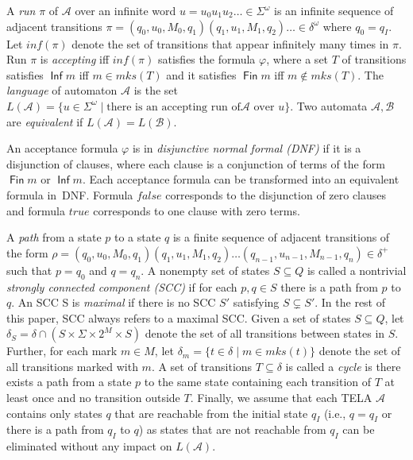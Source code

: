 \documentclass[a4paper,UKenglish,cleveref,autoref,thm-restate]{lipics-v2021}
\newcommand{\todo}[1]{\marginpar{\textcolor{red}{#1}}}
\DeclareMathOperator{\Inf}{\mathsf{Inf}}
\DeclareMathOperator{\Fin}{\mathsf{Fin}}
\newcommand{\minf}{\mathit{inf}}
\newcommand{\mks}{\mathit{mks}}
\def\false{\mathit{false}}
\def\true{\mathit{true}}
\newcommand{\mA}{\mathcal{A}}
\newcommand{\mB}{\mathcal{B}}
\begin{document}
A \emph{run} $\pi$ of $\mA$ over an infinite word
$u = u_{0}u_{1}u_{2}\ldots \in \Sigma^{\omega}$ is an infinite sequence
of adjacent transitions
$\pi=(q_0,u_0,M_0,q_1)(q_1,u_1,M_1,q_2)\ldots\in\delta^{\omega}$ where
$q_0=q_I$. Let $\minf(\pi)$ denote the set of transitions that appear
infinitely many times in $\pi$. Run $\pi$ is \emph{accepting} iff
$\minf(\pi)$ satisfies the formula $\varphi$, where a set $T$ of
transitions satisfies $\Inf m$ iff $m\in\mks(T)$ and it satisfies
$\Fin m$ iff $m\not\in\mks(T)$. The \emph{language} of automaton $\mA$ is
the set
$L(\mA)=\{u\in \Sigma^{\omega}\mid\textrm{there is an accepting run of
}\mA\textrm{ over }u\}$. Two automata $\mA,\mB$ are \emph{equivalent}
if $L(\mA)=L(\mB)$.

An acceptance formula $\varphi$ is in \emph{disjunctive normal formal
  (DNF)} if it is a disjunction of clauses, where each clause is a
conjunction of terms of the form $\Fin m$ or $\Inf m$.  Each
acceptance formula can be transformed into an equivalent formula
in~DNF. Formula $\false$ corresponds to the disjunction of zero
clauses and formula $\true$ corresponds to one clause with zero terms.

A \emph{path} from a state $p$ to a state $q$ is a finite sequence of
adjacent transitions of the form
$\rho=(q_0,u_0,M_0,q_1)(q_1,u_1,M_1,q_2)\ldots(q_{n-1},u_{n-1},M_{n-1},q_n)\in\delta^+$
such that $p=q_0$ and $q=q_n$. A nonempty set of states $S\subseteq Q$
is called a nontrivial \emph{strongly connected component (SCC)} if
for each $p,q\in S$ there is a path from $p$ to $q$. An SCC S is
\emph{maximal} if there is no SCC $S'$ satisfying $S\subsetneq S'$. In
the rest of this paper, SCC always refers to a maximal SCC. Given a
set of states $S\subseteq Q$, let $\delta_S=\delta\cap (S\times \Sigma \times 2^M \times S)$
denote the set of all transitions between states in $S$. Further, for
each mark $m\in M$, let $\delta_m=\{t\in\delta\mid m\in
\mks(t)\}$ denote the set of all transitions
marked with $m$.
A set of transitions $T\subseteq\delta$ is called a \emph{cycle} is
there exists a path from a state $p$ to the same state containing each
transition of $T$ at least once and no transition outside
$T$. Finally, we assume that each TELA $\mA$ contains only states $q$
that are reachable from the initial state $q_I$ (i.e., $q=q_I$ or
there is a path from $q_I$ to $q$) as states that are not reachable
from $q_I$ can be eliminated without any impact on $L(\mA)$.
\end{document}
